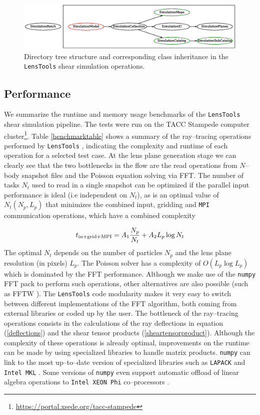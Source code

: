 \documentclass[reprint,aps,prd,superscriptaddress,showkeys,showpacs]{revtex4-1}
\newcommand{\ttt}[1]{\texttt{#1}}
\newcommand{\LT}{\texttt{LensTools} }
\begin{document}
\begin{figure}
\includegraphics[scale=0.6]{Figures/inheritance.eps}
\caption{Directory tree structure and corresponding class inheritance in the \LT shear simulation operations.}
\label{inheritance}
\end{figure}

\subsection{Performance}
%
We summarize the runtime and memory usage benchmarks of the \LT shear simulation pipeline. The tests were run on the TACC Stampede computer cluster\footnote{\url{https://portal.xsede.org/tacc-stampede}}. Table \ref{benchmarktable} shows a summary of the ray--tracing operations performed by \LT, indicating the complexity and runtime of each operation for a selected test case. At the lens plane generation stage we can clearly see that the two bottlenecks in the flow are the read operations from $N$--body snapshot files and the Poisson equation solving via FFT. The number of tasks $N_t$ used to read in a single snapshot can be optimized if the parallel input performance is ideal (i.e independent on $N_t$), as is an optimal value of $N_t(N_p,L_p)$ that minimizes the combined input, gridding and \ttt{MPI} communication operations, which have a combined complexity

\begin{equation}
t_{\rm in+grid+MPI} = A_1\frac{N_p}{N_t} + A_2L_p\log{N_t}
\end{equation} 
%
The optimal $N_t$ depends on the number of particles $N_p$ and the lens plane resolution (in pixels) $L_p$. 
The Poisson solver has a complexity of $O(L_p\log{L_p})$ which is dominated by the FFT performance. Although we make use of the \ttt{numpy} FFT pack \citep{scipy} to perform such operations, other alternatives are also possible (such as FFTW \citep{FFTW05}). The \LT code modularity makes it very easy to switch between different implementations of the FFT algorithm, both coming from external libraries or coded up by the user. 
The bottleneck of the ray--tracing operations consists in the calculations of the ray deflections in equation (\ref{deflections}) and the shear tensor products (\ref{sheartensorproduct}). Although the complexity of these operations is already optimal, improvements on the runtime can be made by using specialized libraries to handle matrix products. \ttt{numpy} can link to the most up--to--date version of specialized libraries such as \ttt{LAPACK} \citep{lapack} and \ttt{Intel MKL} \citep{intel-mkl}. Some versions of \ttt{numpy} even support automatic offload of linear algebra operations to \ttt{Intel XEON Phi} co--processors \citep{xeonphi}.     
\end{document}
